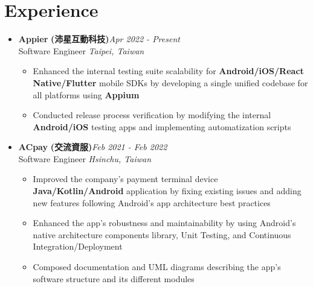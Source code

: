 \section{\sectionheading Experience}

\begin{itemize}[leftmargin=0pt, label={}]%

\item{
{\sectionheading\large{\textbf{Appier}}} \textbf{(沛星互動科技)}\hfill {\sectionheading\small{\textit{Apr 2022 - Present}}}\\
{\sectionheading\small{Software Engineer}}\hfill
{\sectionheading\small{\textit{Taipei, Taiwan}}}

    \vspace{-6pt}
    \begin{itemize}[label=\textbullet, leftmargin=*, noitemsep]
        \item{Enhanced the internal testing suite scalability for \textbf{Android/iOS/React Native/Flutter} mobile SDKs by developing a single unified codebase for all platforms using \textbf{Appium}}
        \item{Conducted release process verification by modifying the internal \textbf{Android/iOS} testing apps and implementing automatization scripts}
    \end{itemize}
}

\item{
{\sectionheading\large{\textbf{ACpay}}} \textbf{(交流資服)}\hfill {\sectionheading\small{\textit{Feb 2021 - Feb 2022}}}\\
{\sectionheading\small{Software Engineer}}\hfill
{\sectionheading\small{\textit{Hsinchu, Taiwan}}}

    \vspace{-6pt}
    \begin{itemize}[label=\textbullet, leftmargin=*, noitemsep]
        \item{Improved the company's payment terminal device \textbf{Java/Kotlin/Android} application by fixing existing issues and adding new features following Android's app architecture best practices}
        \item{Enhanced the app's robustness and maintainability by using Android's native architecture components library, Unit Testing, and Continuous Integration/Deployment}
        \item{Composed documentation and UML diagrams describing the app's software structure and its different modules}
    \end{itemize}
}


\end{itemize}
